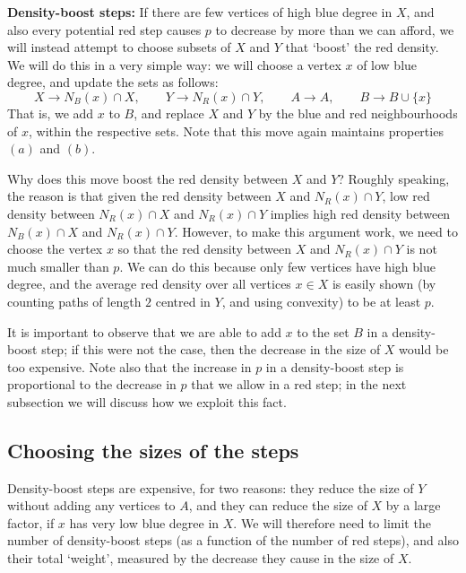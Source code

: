 \documentclass[12pt,reqno]{amsart}
\theoremstyle{definition}
\theoremstyle{remark}
\renewcommand{\to}{\rightarrow}
\begin{document}
\medskip
\noindent \textbf{Density-boost steps:} If there are few vertices of high blue degree in $X$, and also every potential red step causes $p$ to decrease by more than we can afford, we will instead attempt to choose subsets of $X$ and $Y$ that `boost' the red density. We will do this in a very simple way: we will choose a vertex $x$ of low blue degree, and update the sets as follows:
$$X \to N_B(x) \cap X, \qquad Y \to N_R(x) \cap Y, \qquad A \to A, \qquad B \to B \cup \{x\}$$
That is, we add $x$ to $B$, and replace $X$ and $Y$ by the blue and red neighbourhoods of $x$, within the respective sets. Note that this move again maintains properties $(a)$ and $(b)$. 


Why does this move boost the red density between $X$ and $Y$? Roughly speaking, the reason is that given the red density between $X$ and $N_R(x) \cap Y$, low red density between $N_R(x) \cap X$ and $N_R(x) \cap Y$ implies high red density between $N_B(x) \cap X$ and $N_R(x) \cap Y$. However, to make this argument work, we need to choose the vertex $x$ so that the red density between $X$ and $N_R(x) \cap Y$ is not much smaller than $p$. We can do this because only few vertices have high blue degree, and the average red density over all vertices $x \in X$ is easily shown (by counting paths of length $2$ centred in $Y$, and using convexity) to be at least $p$. 

It is important to observe that we are able to add $x$ to the set $B$ in a density-boost step; if this were not the case, then the decrease in the size of $X$ would be too expensive. Note also that the increase in $p$ in a density-boost step is proportional to the decrease in $p$ that we allow in a red step; in the next subsection we will discuss how we exploit this fact. 


\subsection{Choosing the sizes of the steps}\label{scale:sec}

Density-boost steps are expensive, for two reasons: they reduce the size of $Y$ without adding any vertices to $A$, and they can reduce the size of $X$ by a large factor, if $x$ has very low blue degree in $X$. We will therefore need to limit the number of density-boost steps (as a function of the number of red steps), and also their total `weight', measured by the decrease they cause in the size of $X$. 
\end{document}
